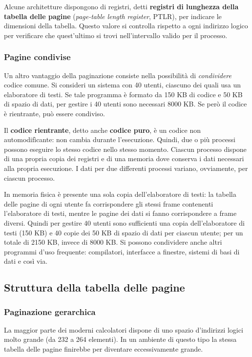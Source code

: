 \documentclass[11pt,a4paper]{article}
\begin{document}
Alcune architetture dispongono di registri, detti
\textbf{registri di lunghezza della tabella delle pagine} (\emph{page-table length register}, PTLR), per indica­re le dimensioni della tabella. Questo valore si controlla rispetto a ogni indirizzo logico per
verificare che quest'ultimo si trovi nell'intervallo valido per il processo.

\subsubsection{Pagine condivise}
Un altro vantaggio della paginazione consiste nella possibilità di \emph{condividere} codice comune. Si
consideri un sistema con 40 utenti, ciascuno dei quali usa un elaboratore di testi. Se tale
programma è formato da 150 KB di codice e 50 KB di spazio di dati, per gestire i 40 utenti sono necessari 8000 KB. Se però il codice è rientrante, può essere condiviso.

Il \textbf{codice rientrante}, detto anche \textbf{codice puro}, è un codice non automodifìcante: non
cambia durante l'esecuzione. Quindi, due o più processi possono eseguire lo stesso codice
nello stesso momento. Ciascun processo dispone di una propria copia dei registri e di una
memoria dove conserva i dati necessari alla propria esecuzione. I dati per due differenti pro­cessi variano, ovviamente, per ciascun processo.

In memoria fisica è presente una sola copia dell'elaboratore di testi: la tabella delle pa­gine di ogni utente fa corrispondere gli stessi frame contenenti l'elaboratore di testi, mentre
le pagine dei dati si fanno corrispondere a frame diversi. Quindi per gestire 40 utenti sono
sufficienti una copia dell'elaboratore di testi (150 KB) e 40 copie dei 50 KB di spazio di dati
per ciascun utente; per un totale di 2150 KB, invece di 8000 KB.
Si possono condividere anche altri programmi d'uso frequente: compilatori, interfacce
a finestre, sistemi di basi di dati e così via.

\subsection{Struttura della tabella delle pagine}
\subsubsection{Paginazione gerarchica}
La maggior parte dei moderni calcolatori dispone di uno spazio d'indirizzi logici molto
grande (da 232 a 264 elementi). In un ambiente di questo tipo la stessa tabella delle pagine fi­nirebbe per diventare eccessivamente grande.
\end{document}
